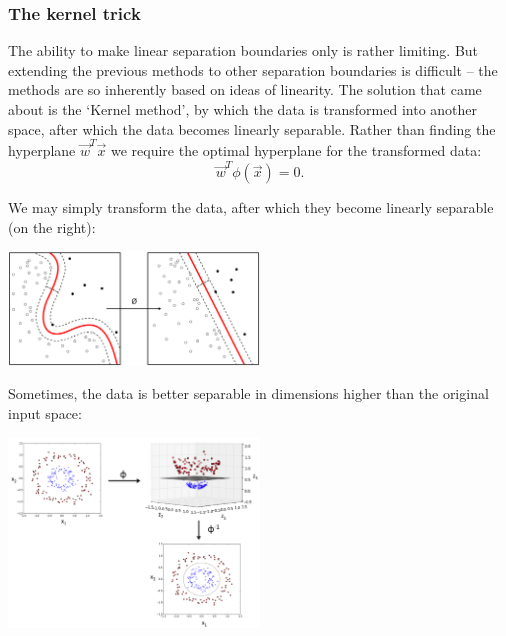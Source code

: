 \documentclass{article}
\begin{document}
\subsubsection{The kernel trick}
The ability to make linear separation boundaries only is rather limiting. But extending the previous methods to other separation boundaries is difficult -- the methods are so inherently based on ideas of linearity. The solution that came about is the `Kernel method', by which the data is transformed into another space, after which the data becomes linearly separable. Rather than finding the hyperplane $\vec{w}^T\vec{x}$ we require the optimal hyperplane for the transformed data:
\begin{equation}
    \vec{w}^T\phi(\vec{x})=0.
\end{equation}
\vspace{-0.5cm}
\begin{testexample}
    We may simply transform the data, after which they become linearly separable (on the right):
    \begin{center}\includegraphics[width=0.5\textwidth]{kernel.png}\end{center}
\end{testexample}
\vspace{-0.15cm}
\begin{testexample}
    Sometimes, the data is better separable in dimensions higher than the original input space:
    \begin{center}\includegraphics[width=0.5\textwidth]{kernel-method-nonlinear-svm.png}\end{center}
\end{testexample}
\end{document}
